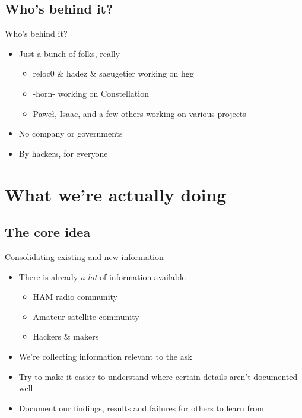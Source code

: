 \subsection{Who's behind it?}
	\begin{frame}{Who's behind it?}
		\begin{itemize}
			\item Just a bunch of folks, really
				\begin{itemize}
					\item reloc0 \& hadez \& saeugetier working on hgg
					\item -horn- working on Constellation
					\item Pawe\l, Isaac, and a few others working on various projects
				\end{itemize}
			\item No company or governments
			\item By hackers, for everyone
		\end{itemize}
	\end{frame}


\section{What we're actually doing}

\subsection{The core idea}
	\begin{frame}{Consolidating existing and new information}
		\begin{itemize}
			\item There is already \emph{a lot} of information available
			\begin{itemize}
				\item HAM radio community
				\item Amateur satellite community
				\item Hackers \& makers
			\end{itemize}
			\item We're collecting information relevant to the ask
			\item Try to make it easier to understand where certain details aren't documented well
			\item Document our findings, results and failures for others to learn from
		\end{itemize}
	\end{frame}

